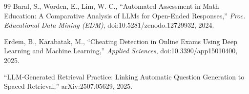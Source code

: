 \documentclass[12pt]{report}
\begin{document}
\begin{thebibliography}{99}
 Baral, S., Worden, E., Lim, W.-C., ``Automated Assessment in Math Education: A Comparative Analysis of LLMs for Open-Ended Responses,'' \textit{Proc. Educational Data Mining (EDM)}, doi:10.5281/zenodo.12729932, 2024.

 Erdem, B., Karabatak, M., ``Cheating Detection in Online Exams Using Deep Learning and Machine Learning,'' \textit{Applied Sciences}, doi:10.3390/app15010400, 2025.

 ``LLM-Generated Retrieval Practice: Linking Automatic Question Generation to Spaced Retrieval,'' arXiv:2507.05629, 2025.

\end{thebibliography}
\end{document}
